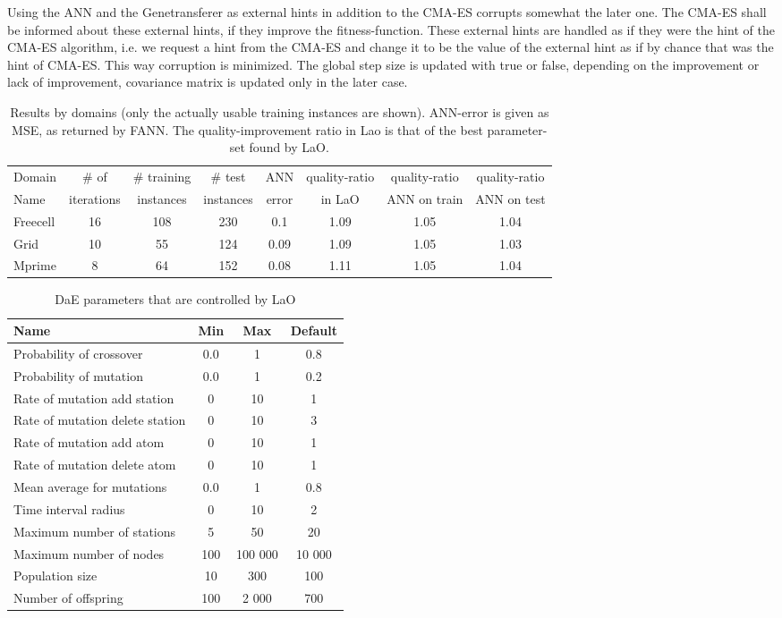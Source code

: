 \documentclass{MYsig-alternate}
\begin{document}
Using the ANN and the Genetransferer as external hints in addition to the CMA-ES corrupts somewhat the later one. The CMA-ES shall be informed about these external hints, if they improve the fitness-function. These external hints are handled as if they were the hint of the CMA-ES algorithm, i.e. we request a hint from the CMA-ES and change it to be the value of the external hint as if by chance that was the hint of CMA-ES. This way corruption is minimized. The global step size is updated with true or false, depending on the improvement or lack of improvement, covariance matrix is updated only in the later case.

\begin{table*}[ht]
\centering
\begin{tabular}{l c c c c c c c}
\hline\hline
Domain & \# of & \# training & \# test &  ANN & quality-ratio & quality-ratio & quality-ratio \\ 
Name & iterations  & instances &  instances &  error & in LaO & ANN on train & ANN on test \\ 
\hline
Freecell& 16 & 108 & 230 & 0.1 & 1.09 & 1.05 & 1.04  \\
Grid & 10 & 55 & 124 & 0.09 & 1.09 & 1.05 & 1.03  \\
Mprime & 8 & 64 & 152 & 0.08 & 1.11 & 1.05 & 1.04   \\
\hline
\end{tabular}
\caption{Results by domains (only the actually usable training instances are shown). ANN-error is given as MSE, as returned by FANN. The quality-improvement ratio in Lao is that of the best parameter-set found by LaO.}
\label{table:domains}
\end{table*} 


\begin{table*}[ht]
\centering
\begin{tabular}{l c c c}
\hline\hline
Name & Min & Max & Default \\ 
\hline
Probability of crossover & 0.0 & 1 & 0.8 \\
Probability of mutation & 0.0& 1& 0.2 \\
Rate of mutation add station& 0& 10& 1 \\
Rate of mutation delete station& 0& 10& 3 \\
Rate of mutation add atom& 0& 10& 1 \\
Rate of mutation delete atom& 0& 10& 1 \\
Mean average for mutations& 0.0& 1& 0.8 \\
Time interval radius& 0& 10& 2 \\
Maximum number of stations& 5& 50& 20 \\
Maximum number of nodes& 100& 100 000& 10 000 \\
Population size& 10& 300& 100 \\
Number of offspring & 100& 2 000& 700 \\
\hline
\end{tabular}
\caption{DaE parameters that are controlled by LaO}
\label{table:parameters}
\end{table*} 
\end{document}
